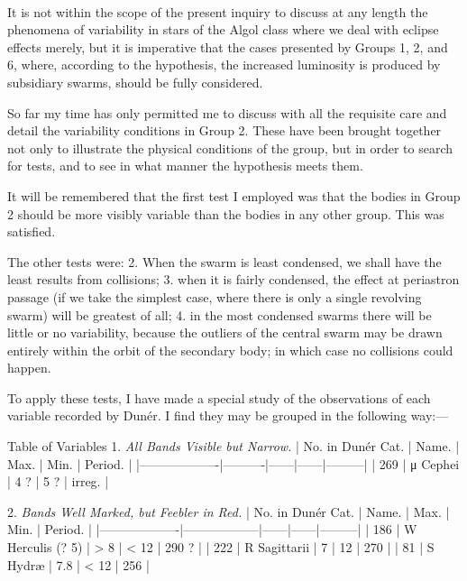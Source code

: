 \documentclass[a4paper, 12pt, oneside, polutonikogreek, english]{article}
\begin{document}
\paragraph{}
It is not within the scope of the present inquiry to discuss at any length the phenomena of variability in stars of the Algol class where we deal with eclipse effects merely, but it is imperative that the cases presented by Groups 1, 2, and 6, where, according to the hypothesis, the increased luminosity is produced by subsidiary swarms, should be fully considered.

So far my time has only permitted me to discuss with all the requisite care and detail the variability conditions in Group 2. These have been brought together not only to illustrate the physical conditions of the group, but in order to search for tests, and to see in what manner the hypothesis meets them.

It will be remembered that the first test I employed was that the bodies in Group 2 should be more visibly variable than the bodies in any other group. This was satisfied.

The other tests were: 2. When the swarm is least condensed, we shall have the least results from collisions; 3. when it is fairly condensed, the effect at periastron passage (if we take the simplest case, where there is only a single revolving swarm) will be greatest of all; 4. in the most condensed swarms there will be little or no variability, because the outliers of the central swarm may be drawn entirely within the orbit of the secondary body; in which case no collisions could happen.

To apply these tests, I have made a special study of the observations of each variable recorded by Dunér. I find they may be grouped in the following way:---

Table of Variables 
1. \emph{All Bands Visible but Narrow.} 
| No. in Dunér Cat. | Name.  | Max. | Min. | Period. |
|-------------------|----------|------|------|---------|
| 269        | μ Cephei | 4 ? | 5 ? | irreg. |

2. \emph{Bands Well Marked, but Feebler in Red.} 
| No. in Dunér Cat. | Name.      | Max. | Min. | Period. |
|-------------------|------------------|------|------|---------|
| 186        | W Herculis (? 5) | > 8 | < 12 | 290 ?  |
| 222        | R Sagittarii   | 7  | 12  | 270   |
| 81        | S Hydræ     | 7.8 | < 12 | 256   |
\end{document}
